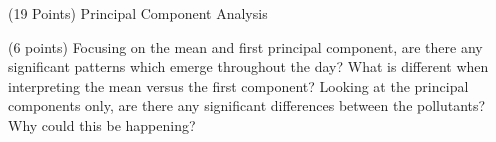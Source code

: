 \documentclass[12pt]{article}
\begin{document}
\begin{question}{(19 Points) Principal Component Analysis}
\begin{subquestion}



\end{subquestion}

\begin{subquestion}{(6 points) Focusing on the mean and first principal component, are there any significant patterns which emerge throughout the day?  What is different when interpreting the mean versus the first component?  Looking at the principal components only, are there any significant differences between the pollutants? Why could this be happening? }




\end{subquestion}
\end{question}
\end{document}
